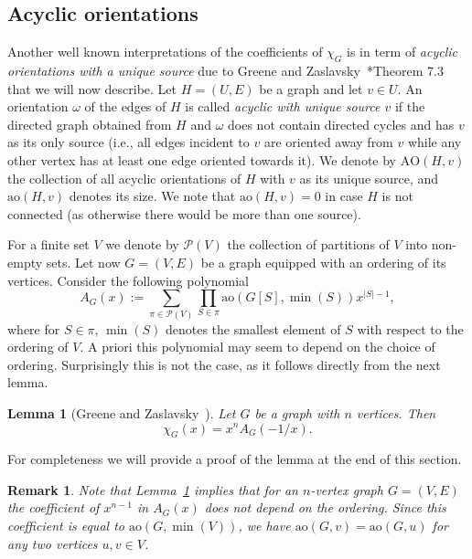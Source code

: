 \documentclass[a4paper,11pt,reqno]{amsart}
\newtheorem{lemma}[corollary]{Lemma}
\newtheorem{remark}[corollary]{Remark}
\numberwithin{equation}{section}
\begin{document}
\subsection{Acyclic orientations}\label{ssec:acyclic}
Another well known interpretations of the coefficients of $\chi_G$ is in term of \emph{acyclic orientations with a unique source} due to Greene and Zaslavsky~\cite{greene1983interpretation}*{Theorem 7.3} that we will now describe.
Let $H=(U,E)$ be a graph and let $v\in U$. 
An orientation $\omega$ of the edges of $H$ is called \emph{acyclic with unique source $v$} if the directed graph obtained from $H$ and $\omega$ does not contain directed cycles and has $v$ as its only source (i.e., all edges incident to $v$ are oriented away from $v$ while any other vertex has at least one edge oriented towards it).
We denote by $\text{AO}(H,v)$ the collection of all acyclic orientations of $H$ with $v$ as its unique source, and $\text{ao}(H,v)$ denotes its size. We note that $\text{ao}(H,v)=0$ in case $H$ is not connected (as otherwise there would be more than one source).

For a finite set $V$ we denote by $\mathcal{P}(V)$ the collection of partitions of $V$ into non-empty sets.
Let now $G=(V,E)$ be a graph equipped with an ordering of its vertices.
Consider the following polynomial
\begin{equation}\label{eq:partial orientations}
A_G(x):=\sum_{\pi\in \mathcal{P}(V)}\prod_{S\in \pi} \text{ao}(G[S],\min(S))x^{|S|-1},    
\end{equation}
where for $S\in \pi$, $\min(S)$ denotes the smallest element of $S$ with respect to the ordering of $V$.
A priori this polynomial may seem to depend on the choice of ordering.
Surprisingly this is not the case, as it follows directly from the next lemma.
\begin{lemma}[Greene and Zaslavsky~\cite{greene1983interpretation}]\label{lem:acyclic to chromatic}
Let $G$ be a graph with $n$ vertices. Then 
\[\chi_G(x)=x^nA_G(-1/x).\]
\end{lemma}
For completeness we will provide a proof of the lemma at the end of this section.
\begin{remark}\label{rem:AO do not depend on ordering}
Note that Lemma~\ref{lem:acyclic to chromatic} implies that for an $n$-vertex graph $G=(V,E)$ the coefficient of $x^{n-1}$ in $A_G(x)$ does not depend on the ordering.
Since this coefficient is equal to $\text{ao}(G,\min(V))$, we have $\text{ao}(G,v)=\text{ao}(G,u)$ for any two vertices $u,v\in V$.
\end{remark}
\end{document}
